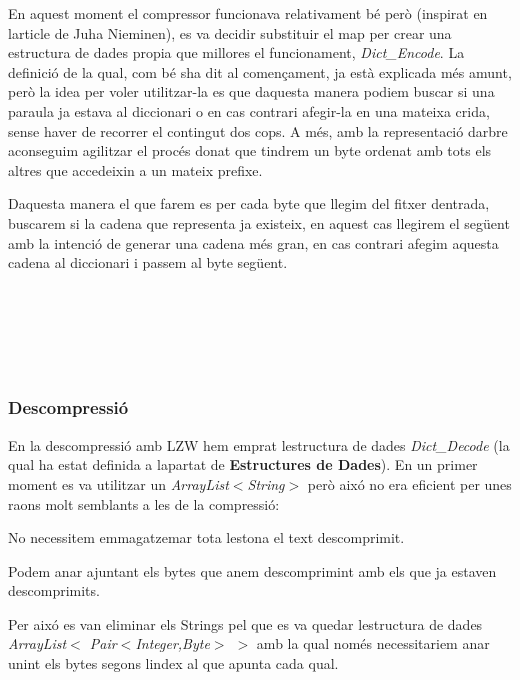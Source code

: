En aquest moment el compressor funcionava relativament bé però (inspirat en l\textquotesingle{}article de Juha Nieminen), es va decidir substituir el map per crear una estructura de dades propia que millores el funcionament, {\itshape Dict\+\_\+\+Encode}. La definició de la qual, com bé s\textquotesingle{}ha dit al començament, ja està explicada més amunt, però la idea per voler utilitzar-\/la es que d\textquotesingle{}aquesta manera podiem buscar si una paraula ja estava al diccionari o en cas contrari afegir-\/la en una mateixa crida, sense haver de recorrer el contingut dos cops. A més, amb la representació d\textquotesingle{}arbre aconseguim agilitzar el procés donat que tindrem un byte ordenat amb tots els altres que accedeixin a un mateix prefixe.

D\textquotesingle{}aquesta manera el que farem es per cada byte que llegim del fitxer d\textquotesingle{}entrada, buscarem si la cadena que representa ja existeix, en aquest cas llegirem el següent amb la intenció de generar una cadena més gran, en cas contrari afegim aquesta cadena al diccionari i passem al byte següent.

~\newline


~\newline


~\newline


\subsubsection*{Descompressió}

En la descompressió amb L\+ZW hem emprat l\textquotesingle{}estructura de dades {\itshape Dict\+\_\+\+Decode} (la qual ha estat definida a l\textquotesingle{}apartat de {\bfseries Estructures de Dades}). En un primer moment es va utilitzar un {\itshape Array\+List$<$\+String$>$} però aixó no era eficient per unes raons molt semblants a les de la compressió\+:
\begin{DoxyItemize}
\item No necessitem emmagatzemar tota l\textquotesingle{}estona el text descomprimit.
\item Podem anar ajuntant els bytes que anem descomprimint amb els que ja estaven descomprimits.
\end{DoxyItemize}

Per aixó es van eliminar els Strings pel que es va quedar l\textquotesingle{}estructura de dades {\itshape Array\+List$<$ Pair$<$Integer,Byte$>$ $>$} amb la qual només necessitariem anar unint els bytes segons l\textquotesingle{}index al que apunta cada qual.

